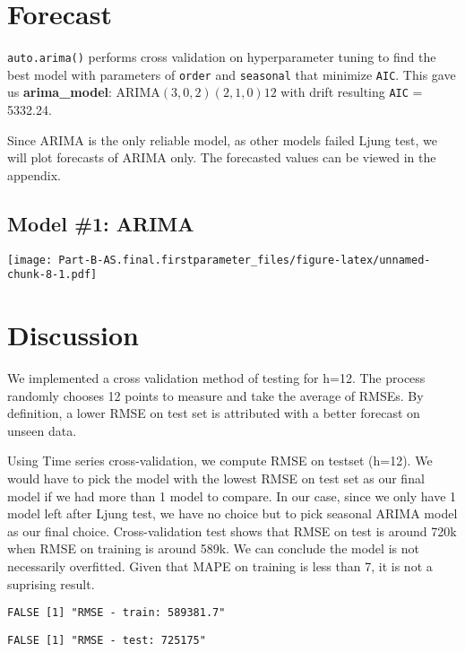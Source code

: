 \documentclass[openany]{book}
\begin{document}
\section*{Forecast}\label{b-forecast}

\texttt{auto.arima()} performs cross validation on hyperparameter tuning
to find the best model with parameters of \texttt{order} and
\texttt{seasonal} that minimize \texttt{AIC}. This gave us
\textbf{arima\_model}: ARIMA\((3,0,2)(2,1,0)12\) with drift resulting
\texttt{AIC} = 5332.24.

Since ARIMA is the only reliable model, as other models failed Ljung
test, we will plot forecasts of ARIMA only. The forecasted values can be
viewed in the appendix.

\subsection{Model \#1: ARIMA}\label{model-1-arima-1}

\texttt{[image: Part-B-AS.final.firstparameter\_files/figure-latex/unnamed-chunk-8-1.pdf]}

\section*{Discussion}\label{b-discussion}

We implemented a cross validation method of testing for h=12. The
process randomly chooses 12 points to measure and take the average of
RMSEs. By definition, a lower RMSE on test set is attributed with a
better forecast on unseen data.

Using Time series cross-validation, we compute RMSE on testset (h=12).
We would have to pick the model with the lowest RMSE on test set as our
final model if we had more than 1 model to compare. In our case, since
we only have 1 model left after Ljung test, we have no choice but to
pick seasonal ARIMA model as our final choice. Cross-validation test
shows that RMSE on test is around 720k when RMSE on training is around
589k. We can conclude the model is not necessarily overfitted. Given
that MAPE on training is less than 7, it is not a suprising result.

\begin{verbatim}
FALSE [1] "RMSE - train: 589381.7"
\end{verbatim}

\begin{verbatim}
FALSE [1] "RMSE - test: 725175"
\end{verbatim}
\end{document}
